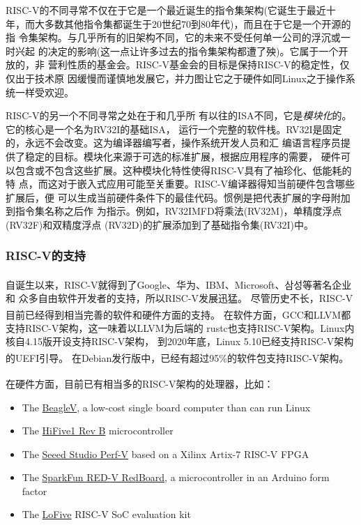 \documentclass[UTF8,fontset=none,linespread=1.15]{ctexart}
\let\nosupcite\cite
\renewcommand*{\cite}[1]{\textsuperscript{\nosupcite{#1}}}
\begin{document}
RISC-V的不同寻常不仅在于它是一个最近诞生的指令集架构(它诞生于最近十
年，而大多数其他指令集都诞生于20世纪70到80年代)，而且在于它是一个开源的指
令集架构。与几乎所有的旧架构不同，它的未来不受任何单一公司的浮沉或一时兴起
的决定的影响(这一点让许多过去的指令集架构都遭了殃)。它属于一个开放的，非
营利性质的基金会。RISC-V基金会的目标是保持RISC-V的稳定性，仅仅出于技术原
因缓慢而谨慎地发展它，并力图让它之于硬件如同Linux之于操作系统一样受欢迎。

RISC-V的另一个不同寻常之处在于和几乎所
有以往的ISA不同，它是\textit{模块化}的。它的核心是一个名为RV32I的基础ISA，
运行一个完整的软件栈。RV32I是固定的，永远不会改变。这为编译器编写者，操作系统开发人员和汇
编语言程序员提供了稳定的目标。模块化来源于可选的标准扩展，根据应用程序的需要，
硬件可以包含或不包含这些扩展。这种模块化特性使得RISC-V具有了袖珍化、低能耗的特
点，而这对于嵌入式应用可能至关重要。RISC-V编译器得知当前硬件包含哪些扩展后，便
可以生成当前硬件条件下的最佳代码。惯例是把代表扩展的字母附加到指令集名称之后作
为指示。例如，RV32IMFD将乘法(RV32M)，单精度浮点(RV32F)和双精度浮点
(RV32D)的扩展添加到了基础指令集(RV32I)中。

\subsubsection{RISC-V的支持}
自诞生以来，RISC-V就得到了Google、华为、IBM、Microsoft、삼성等著名企业\cite{bib:risc-v-manual}和
众多自由软件开发者的支持，所以RISC-V发展迅猛。
尽管历史不长，RISC-V目前已经得到相当完善的软件和硬件方面的支持。
在软件方面，GCC\cite{bib:riscv-gcc}和LLVM\cite{bib:riscv-llvm}都
支持RISC-V架构，这一味着以LLVM为后端的
rustc也支持RISC-V架构。Linux内核自4.15版开设支持RISC-V架构，
到2020年底，Linux 5.10已经支持RISC-V架构的UEFI引导。\cite{bib:riscv-linux}
在Debian发行版中，已经有超过95\%的软件包支持RISC-V架构。\cite{bib:riscv-debian}

在硬件方面，目前已有相当多的RISC-V架构的处理器，比如：\cite{bib:riscv-support}
\begin{itemize}
\item The \href{https://beagleboard.org/beaglev}{BeagleV}, a low-cost single board computer than can run Linux
\item The \href{https://www.sifive.com/boards/hifive1-rev-b}{HiFive1 Rev B} microcontroller
\item The \href{https://www.seeedstudio.com/Perf-V-Based-on-Xilinx-Artix-7-FPGA-RISC-V-opensource-p-4058.html}{Seeed Studio Perf-V} based on a Xilinx Artix-7 RISC-V FPGA
\item The \href{https://www.sparkfun.com/products/15594}{SparkFun RED-V RedBoard}, a microcontroller in an Arduino form factor
\item The \href{https://www.digikey.ca/en/products/detail/groupgets-llc/LOFIVE-R1/10186935}{LoFive} RISC-V SoC evaluation kit
\end{itemize}
\end{document}
